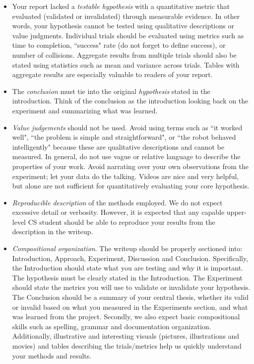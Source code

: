 \begin{itemize}
\item Your report lacked a \textit{testable hypothesis} with a quantitative metric that evaluated (validated or invalidated) through measurable evidence. In other words, your hypothesis cannot be tested using qualitative descriptions or value judgments.  Individual trials should be evaluated using metrics such as time to completion, ``success" rate (do not forget to define success), or number of collisions. Aggregate results from multiple trials should also be stated using statistics such as mean and variance across trials.  Tables with aggregate results are especially valuable to readers of your report.

\item The \textit{conclusion} must tie into the original \textit{hypothesis} stated in the introduction.  Think of the conclusion as the introduction looking back on the experiment and summarizing what was learned.

\item \textit{Value judgements} should not be used. Avoid using terms such as ``it worked well", ``the problem is simple and straightforward", or ``the robot behaved intelligently" because these are qualitative descriptions and cannot be measured. In general, do not use vague or relative language to describe the properties of your work.  Avoid narrating over your own observations from the experiment; let your data do the talking.  Videos are nice and very helpful, but alone are not sufficient for quantitatively evaluating your core hypothesis.

\item \textit{Reproducible description} of the methods employed.  We do not expect excessive detail or verbosity.  However, it is expected that any capable upper-level CS student should be able to reproduce your results from the description in the writeup.

\item \textit{Compositional organization}. The writeup should be properly sectioned into: Introduction, Approach, Experiment, Discussion and Conclusion. Specifically, the Introduction should state what you are testing and why it is important. The hypothesis must be clearly stated in the Introduction. The Experiment should state the metrics you will use to validate or invalidate your hypothesis. The Conclusion should be a summary of your central thesis, whether its valid or invalid based on what you measured in the Experiments section, and what was learned from the project. Secondly, we also expect basic compositional skills such as spelling, grammar and documentation organization. Additionally, illustrative and interesting visuals (pictures, illustrations and movies) and tables describing the trials/metrics help us quickly understand your methods and results.
\end{itemize}

